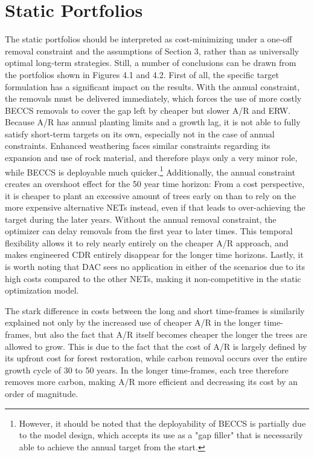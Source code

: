 



\section{Static Portfolios}

The static portfolios should be interpreted as cost‑minimizing under a one‑off removal constraint and the assumptions of Section 3, rather than as universally optimal long‑term strategies. Still, a number of conclusions can be drawn from the portfolios shown in Figures 4.1 and 4.2. First of all, the specific target formulation has a significant impact on the results. With the annual constraint, the removals must be delivered immediately, which forces the use of more costly BECCS removals to cover the gap left by cheaper but slower A/R and ERW. Because A/R has annual planting limits and a growth lag, it is not able to fully satisfy short-term targets on its own, especially not in the case of annual constraints. Enhanced weathering faces similar constraints regarding its expansion and use of rock material, and therefore plays only a very minor role, while BECCS is deployable much quicker.\footnote{However, it should be noted that the deployability of BECCS is partially due to the model design, which accepts its use as a "gap filler" that is necessarily able to achieve the annual target from the start.} Additionally, the annual constraint creates an overshoot effect for the 50 year time horizon: From a cost perspective, it is cheaper to plant an excessive amount of trees early on than to rely on the more expensive alternative NETs instead, even if that leads to over-achieving the target during the later years. Without the annual removal constraint, the optimizer can delay removals from the first year to later times. This temporal flexibility allows it to rely nearly entirely on the cheaper A/R approach, and makes engineered CDR entirely disappear for the longer time horizons. Lastly, it is worth noting that DAC sees no application in either of the scenarios due to its high costs compared to the other NETs, making it non-competitive in the static optimization model.\vspace{2mm}

The stark difference in costs between the long and short time-frames is similarily explained not only by the increased use of cheaper A/R in the longer time-frames, but also the fact that A/R itself becomes cheaper the longer the trees are allowed to grow. This is due to the fact that the cost of A/R is largely defined by its upfront cost for forest restoration, while carbon removal occurs over the entire growth cycle of 30 to 50 years. In the longer time-frames, each tree therefore removes more carbon, making A/R more efficient and decreasing its cost by an order of magnitude.\vspace{2mm}


